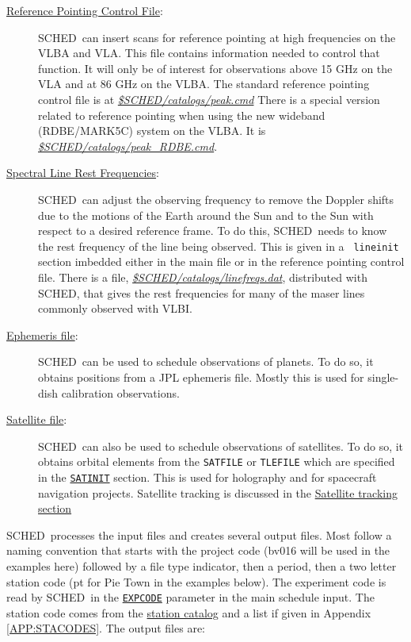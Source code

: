 \documentclass{report}
\newcommand{\sched}{{\sc SCHED}}
\newcommand{\schedb}{{\sc SCHED~}}
\begin{document}
\begin{description}
\item[
{\hyperref[SEC:REFPOINT]{Reference Pointing Control File}}:]
\schedb can insert scans for reference pointing at high frequencies on
the VLBA and VLA.  This file contains information needed to control
that function.  It will only be of interest for observations above 15 GHz
on the VLA and at 86 GHz on the VLBA.  The standard reference pointing
control file is at 
{\href{catalogs/peak.cmd}{{\sl \$SCHED/catalogs/peak.cmd}}}
There is a special version related to reference pointing when using the
new wideband (RDBE/MARK5C) system on the VLBA.  It is 
{\href{catalogs/peak\_RDBE.cmd}{{\sl \$SCHED/catalogs/peak\_RDBE.cmd}}}.

\item[
{\hyperref[SEC:LINE]{Spectral Line Rest Frequencies}}:] \schedb can
adjust the observing frequency to remove the Doppler shifts due to the
motions of the Earth around the Sun and to the Sun with respect to a
desired reference frame.  To do this, \schedb needs to know the rest
frequency of the line being observed.  This is given in a {\tt
lineinit} section imbedded either in the main file or in the reference
pointing control file.  There is a file, 
{\href{catalogs/linefreqs.dat}{{\sl \$SCHED/catalogs/linefreqs.dat}}},
distributed with \sched,
that gives the rest frequencies for many of the maser
lines commonly observed with VLBI.

\item[
{\hyperref[MP:EPHFILE]{Ephemeris file}}:] \schedb can be used to
schedule observations of planets.  To do so, it obtains positions from
a JPL ephemeris file.  Mostly this is used for single-dish calibration
observations.

\item[
{\hyperref[SEC:SATEL]{Satellite file}}:] \schedb can also be used
to schedule observations of satellites.  To do so, it obtains orbital
elements from the {\tt SATFILE} or {\tt TLEFILE} which are specified
in the {\hyperref[SEC:SATINIT]{\tt SATINIT}} section.  This is used for
holography and for spacecraft navigation projects.  Satellite tracking
is discussed in the {\hyperref[SEC:SATEL]{Satellite tracking section}}

\end{description}

\schedb processes the input files and creates several output
files.  Most follow a naming convention that starts with
the project code (bv016 will be used in the examples here) followed
by a file type indicator, then a period, then a two letter station
code (pt for Pie Town in the examples below).  The experiment code
is read by \schedb in the 
{\hyperref[MP:EXPCODE]{{\tt EXPCODE}}} parameter
in the main schedule input.  The station code comes from the
{\hyperref[SEC:STACAT]{station catalog}} and a list if given in
Appendix \ref{APP:STACODES}. The output files are:
\end{document}

